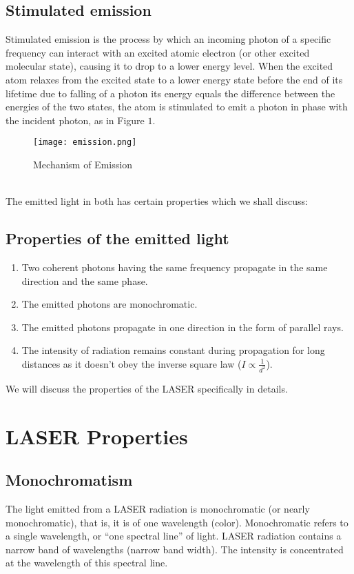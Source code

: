 \documentclass[a4paper,12pt]{article}
\begin{document}
\subsection{Stimulated emission}
Stimulated emission is the process by which an incoming photon of a specific frequency can interact with an excited atomic electron (or other excited molecular state), causing it to drop to a lower energy level.
When the excited atom relaxes from the excited state to a lower energy state before the end of its lifetime due to falling of a photon its energy equals the difference between the energies of the two states, the atom is stimulated to emit a photon in phase with the incident photon, as in Figure $1$.
\begin{figure}[h!]
\centering
\texttt{[image: emission.png]}
\caption{Mechanism of Emission}
\label{fig:emission}
\end{figure}\\
The emitted light in both has certain properties which we shall discuss:
\subsection{Properties of the emitted light}
\begin{enumerate}
  \item Two coherent photons having the same frequency propagate in the same direction and the same phase. 
  \item The emitted photons are monochromatic. 
  \item The emitted photons propagate in one direction in the form of parallel rays.  
  \item The intensity of radiation remains constant during propagation for long distances as it doesn't obey the inverse square law ($I\propto \frac{1}{d^2}$). 
\end{enumerate}
We will discuss the properties of the LASER specifically in details.
\section{LASER Properties}
\subsection{Monochromatism}
The light emitted from a LASER radiation is monochromatic (or nearly monochromatic), that is, it is of one wavelength (color).  Monochromatic refers to a single wavelength, or “one spectral line” of light. LASER radiation contains a narrow band of wavelengths (narrow band width). The intensity is concentrated at the wavelength of this spectral line. 
\end{document}
